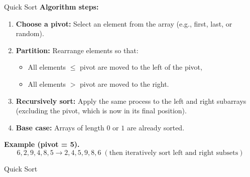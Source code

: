 \documentclass[aspectratio=169]{beamer}
\begin{document}
\begin{frame}{Quick Sort}
  \textbf{Algorithm steps:}
  \begin{enumerate}
    \item \textbf{Choose a pivot:}
      Select an element from the array (e.g., first, last, or random).
    \item \textbf{Partition:}
      Rearrange elements so that:
      \begin{itemize}
        \item All elements $\leq$ pivot are moved to the left of the pivot,
        \item All elements $>$ pivot are moved to the right.
      \end{itemize}
    \item \textbf{Recursively sort:}
      Apply the same process to the left and right subarrays (excluding the pivot, which is now in its final position).
    \item \textbf{Base case:}
      Arrays of length $0$ or $1$ are already sorted.
  \end{enumerate}
  \medskip
\textbf{Example (pivot = 5).}
\[
6,2,9,4,8,\boxed{5}
\to 2,4,\boxed{5},9,8,6
\;(\text{then iteratively sort left and right subsets})
\]
\end{frame}

\begin{frame}[fragile]{Quick Sort}

\vspace*{-2cm}
  \centering
\end{frame}
\end{document}
